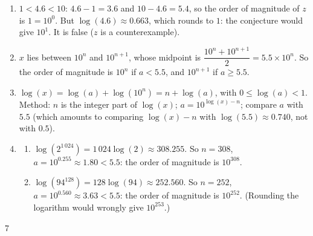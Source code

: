 {\begin{enumerate}
\begin{enumerate}[label=\alph*.]
  \end{enumerate}
\item $1<4.6<10$: $4.6-1=3.6$ and $10-4.6=5.4$, so the order of magnitude of $z$ is $1=10^0$. But $\log(4.6)\approx0.663$, which rounds to $1$: the conjecture would give $10^1$. It is false ($z$ is a counterexample).
\item $x$ lies between $10^n$ and $10^{n+1}$, whose midpoint is $\dfrac{10^n+10^{n+1}}2=5.5\times10^n$. So the order of magnitude is $10^n$ if $a<5.5$, and $10^{n+1}$ if $a\geqslant5.5$.
\item $\log(x)=\log(a)+\log(10^n)=n+\log(a)$, with $0\leqslant\log(a)<1$. Method: $n$ is the integer part of $\log(x)$; $a=10^{\log(x)-n}$; compare $a$ with $5.5$ (which amounts to comparing $\log(x)-n$ with $\log(5.5)\approx0.740$, not with $0.5$).
\item
  \begin{enumerate}[label=\alph*.]
  \item $\log(2^{1\,024})=1\,024\log(2)\approx308.255$. So $n=308$, $a=10^{0.255}\approx1.80<5.5$: the order of magnitude is $10^{308}$.
  \item $\log(94^{128})=128\log(94)\approx252.560$. So $n=252$, $a=10^{0.560}\approx3.63<5.5$: the order of magnitude is $10^{252}$. (Rounding the logarithm would wrongly give $10^{253}$.)
  \end{enumerate}
\end{enumerate}
}{7}

